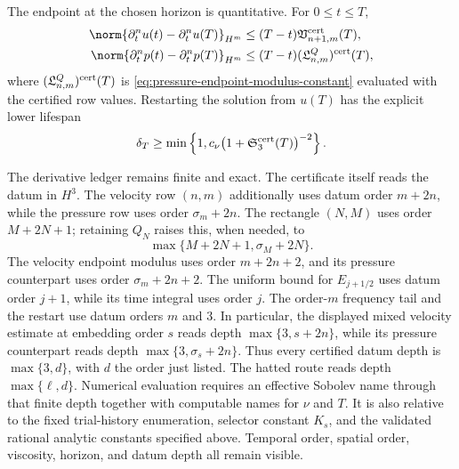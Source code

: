 \begin{corollary}
The endpoint at the chosen horizon is quantitative.  For \(0\le t\le T\),
\begin{align}
 \norm{\partial_t^nu(t)-\partial_t^nu(T)}_{H^m}
 &\le(T-t)\mathfrak V_{n+1,m}^{\rm cert}(T),
 \label{eq:final-endpoint-modulus}\\
 \norm{\partial_t^np(t)-\partial_t^np(T)}_{H^m}
 &\le(T-t)(\mathfrak L^Q_{n,m})^{\rm cert}(T),
 \label{eq:final-pressure-endpoint-modulus}
\end{align}
where \((\mathfrak L^Q_{n,m})^{\rm cert}(T)\) is
\eqref{eq:pressure-endpoint-modulus-constant} evaluated with the certified
row values.  Restarting the solution from \(u(T)\) has the explicit lower
lifespan
\begin{equation}
 \delta_T
 \ge\min\left\{1,
 c_\nu\bigl(1+\mathfrak S_3^{\rm cert}(T)\bigr)^{-2}
 \right\}.
 \label{eq:final-restart-lifespan}
\end{equation}

The derivative ledger remains finite and exact.  The certificate itself reads
the datum in \(H^3\).  The velocity row \((n,m)\) additionally uses datum
order \(m+2n\), while the pressure row uses order
\(\sigma_m+2n\).  The rectangle \((N,M)\) uses order \(M+2N+1\);
retaining \(Q_N\) raises this, when needed, to
\[
 \max\{M+2N+1,\sigma_M+2N\}.
\]
The velocity endpoint modulus uses order \(m+2n+2\), and its pressure
counterpart uses order \(\sigma_m+2n+2\).  The uniform bound for
\(E_{j+1/2}\) uses datum order \(j+1\), while its time integral uses order
\(j\).  The order-\(m\) frequency tail and the restart use datum orders
\(m\) and \(3\).  In particular, the displayed mixed velocity estimate at
embedding order \(s\) reads depth \(\max\{3,s+2n\}\), while its pressure
 counterpart reads depth \(\max\{3,\sigma_s+2n\}\).  Thus every certified
 datum depth is
\(\max\{3,d\}\), with \(d\) the order just listed.  The hatted route reads
depth \(\max\{\ell,d\}\).  Numerical evaluation requires an effective Sobolev
name through that finite depth together with computable names for \(\nu\) and
\(T\).  It is also relative to the fixed trial-history enumeration, selector
constant \(K_s\), and the validated rational analytic constants specified
above.  Temporal order, spatial order, viscosity, horizon, and datum depth all
remain visible.


\end{corollary}
